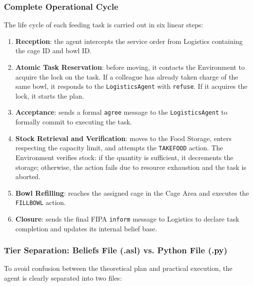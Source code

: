 \documentclass{article}
\renewcommand{\_}{\oldtextunderscore\allowbreak}
\begin{document}
\subsubsection{Complete Operational Cycle}
The life cycle of each feeding task is carried out in six linear steps:
\begin{enumerate}
    \item \textbf{Reception}: the agent intercepts the service order from Logistics containing the cage ID and bowl ID.
    \item \textbf{Atomic Task Reservation}: before moving, it contacts the Environment to acquire the lock on the task. If a colleague has already taken charge of the same bowl, it responds to the \texttt{LogisticsAgent} with \texttt{refuse}. If it acquires the lock, it starts the plan.
    \item \textbf{Acceptance}: sends a formal \texttt{agree} message to the \texttt{LogisticsAgent} to formally commit to executing the task.
    \item \textbf{Stock Retrieval and Verification}: moves to the Food Storage, enters respecting the capacity limit, and attempts the \texttt{TAKE\_FOOD} action. The Environment verifies stock: if the quantity is sufficient, it decrements the storage; otherwise, the action fails due to resource exhaustion and the task is aborted.
    \item \textbf{Bowl Refilling}: reaches the assigned cage in the Cage Area and executes the \texttt{FILL\_BOWL} action.
    \item \textbf{Closure}: sends the final FIPA \texttt{inform} message to Logistics to declare task completion and updates its internal belief base.
\end{enumerate}
\subsubsection{Tier Separation: Beliefs File (.asl) vs. Python File (.py)}
To avoid confusion between the theoretical plan and practical execution, the agent is clearly separated into two files:
\end{document}

